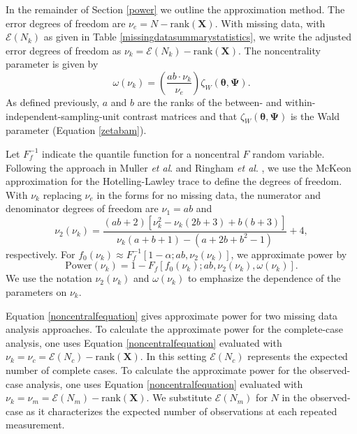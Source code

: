 \documentclass[11pt]{article}
\begin{document}
In the remainder of Section \ref{power} we outline the approximation method. The error degrees of freedom are $\nu_{e}=N-\text{rank}\left(\boldsymbol{X}\right)$. With missing data, with $\mathcal{E}\left(N_{k}\right)$ as given in Table \ref{missingdatasummarystatistics}, we write the adjusted error degrees of freedom as $\nu_{k}=\mathcal{E}\left(N_{k}\right)-\text{rank}\left(\boldsymbol{X}\right)$. The noncentrality parameter is given by
\begin{equation}
\label{therealequation}
\omega\left(\nu_{k}\right)=\left(\frac{ab\cdot\nu_{k}}{\nu_{e}}\right)\zeta_{W}\left(\boldsymbol{\theta},\boldsymbol{\Psi}\right).
\end{equation}
As defined previously, $a$ and $b$ are the ranks of the between- and within-independent-sampling-unit contrast matrices and that $\zeta_{W}\left(\boldsymbol{\theta},\boldsymbol{\Psi}\right)$ is the Wald parameter (Equation \ref{zetabam}). 

Let $F^{-1}_{f}$ indicate the quantile function for a noncentral $F$ random variable. Following the approach in Muller \textit{et al}. \cite{muller_power_1992, muller_statistical_2007} and Ringham \textit{et al}. \cite{ringham_multivariate_2016}, we use the McKeon \cite{mckeon_f_1974} approximation for the Hotelling-Lawley trace to define the degrees of freedom. With $\nu_{k}$ replacing $\nu_{e}$ in the forms for no missing data, the numerator and denominator degrees of freedom are $\nu_{1}=ab$ and 
\begin{equation}
\nu_{2}\left(\nu_{k}\right)=\frac{\left(ab+2\right)\left[\nu_{k}^2-\nu_{k}\left(2b+3\right)+b\left(b+3\right)\right]}{\nu_{k}\left(a+b+1\right)-\left(a+2b+b^{2}-1\right)}+4,
\end{equation}
respectively. For $f_{0}\left(\nu_{k}\right)\approx F^{-1}_{f}\left[1-\alpha;ab,\nu_2\left(\nu_k\right)\right]$, we approximate power by
\begin{equation}
\label{noncentralfequation}
\text{Power}\left(\nu_{k}\right)=1-F_{f}\left[f_{0}\left(\nu_{k}\right);ab,\nu_{2}\left(\nu_{k}\right),\omega\left(\nu_{k}\right)\right].
\end{equation}
We use the notation $\nu_{2}\left(\nu_{k}\right)$ and $\omega\left(\nu_{k}\right)$ to emphasize the dependence of the parameters on $\nu_{k}$.

Equation \ref{noncentralfequation} gives approximate power for two missing data analysis approaches. To calculate the approximate power for the complete-case analysis, one uses Equation \ref{noncentralfequation} evaluated with $\nu_{k}=\nu_{c}=\mathcal{E}\left(N_{c}\right)-\text{rank}\left(\boldsymbol{X}\right)$. In this setting $\mathcal{E}\left(N_{c}\right)$ represents the expected number of complete cases. To calculate the approximate power for the observed-case analysis, one uses Equation \ref{noncentralfequation} evaluated with $\nu_{k}=\nu_{m}=\mathcal{E}\left(N_{m}\right)-\text{rank}\left(\boldsymbol{X}\right)$. We substitute $\mathcal{E}\left(N_{m}\right)$ for $N$ in the observed-case as it characterizes the expected number of observations at each repeated measurement.
\end{document}
